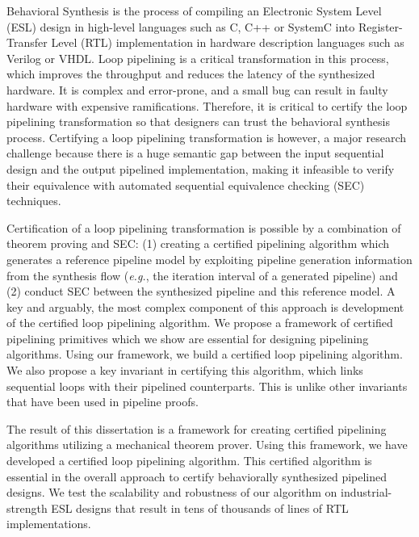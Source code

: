 Behavioral Synthesis is the process of compiling an Electronic System Level (ESL) design in
high-level languages such as C, C++ or SystemC into Register-Transfer Level (RTL) implementation
in hardware description languages such as Verilog or VHDL.
Loop pipelining is a critical transformation in this process, which improves
the throughput and reduces the latency of the synthesized hardware. It is
complex and error-prone, and a small bug can result in faulty hardware with expensive
ramifications. Therefore, it is critical to certify the loop pipelining transformation
so that designers can trust the behavioral synthesis process.
Certifying a loop pipelining transformation is however, a major research challenge
because there is a huge semantic gap between the input sequential design and the output
pipelined implementation, making it infeasible to verify their equivalence with automated sequential equivalence
checking (SEC) techniques.

Certification of a loop pipelining transformation is possible by a combination of theorem
proving and SEC: (1) creating a certified pipelining algorithm which generates a reference
pipeline model by exploiting pipeline generation information from the synthesis flow ({\em e.g.},
the iteration interval of a generated pipeline) and (2) conduct SEC between the synthesized pipeline
and this reference model. A key and arguably, the most complex component of this
approach is development of the certified
loop pipelining algorithm. We propose a framework of certified pipelining primitives which we show
are essential for designing pipelining algorithms. Using our framework, we build
a certified loop pipelining algorithm. We also propose a key invariant in certifying this algorithm, which links sequential loops
with their pipelined counterparts. This is unlike other invariants that have been used in pipeline proofs.

The result of this dissertation is a framework for creating certified pipelining algorithms
utilizing a mechanical theorem prover. Using this framework, we have developed a certified loop pipelining
algorithm. This certified algorithm is essential in the overall approach to certify
behaviorally synthesized pipelined designs. We test the scalability and robustness of our algorithm on
industrial-strength ESL designs that result in tens of thousands of lines of RTL implementations.
